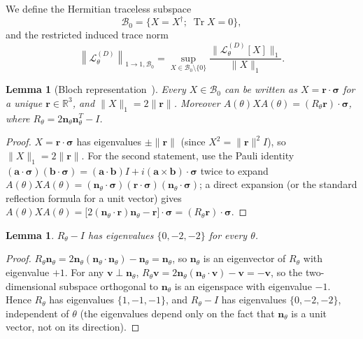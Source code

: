 \documentclass[aps,pra,reprint,superscriptaddress,nofootinbib,longbibliography]{revtex4-2}
\newtheorem{lemma}[theorem]{Lemma}
\newcommand{\Bzero}{\mathcal{B}_0}
\newcommand{\supnorm}[1]{\left\|#1\right\|_{1\rightarrow1,\Bzero}}
\begin{document}
We define the Hermitian traceless subspace
\begin{equation}
\mathcal{B}_0 = \{X=X^\dagger;\; \operatorname{Tr}X=0\},
\label{eq:B0}
\end{equation}
and the restricted induced trace norm
\begin{equation}
\supnorm{\mathcal{L}^{(D)}_\theta}
= \sup_{X\in\mathcal{B}_0\setminus\{0\}}
\frac{\|\mathcal{L}^{(D)}_\theta[X]\|_1}{\|X\|_1}.
\label{eq:norm}
\end{equation}

\begin{lemma}[Bloch representation~\cite{nielsen2010quantum}]
\label{lem:isometry}
Every $X\in\mathcal{B}_0$ can be written as $X=\mathbf{r}\cdot\boldsymbol{\sigma}$
for a unique $\mathbf{r}\in\mathbb R^3$, and $\|X\|_1=2\|\mathbf{r}\|$.
Moreover $A(\theta)XA(\theta) = (R_\theta\mathbf r)\cdot\boldsymbol\sigma$,
where $R_\theta = 2\mathbf n_\theta\mathbf n_\theta^{T}-I$.
\end{lemma}
\begin{proof}
$X=\mathbf r\cdot\boldsymbol\sigma$ has eigenvalues $\pm\|\mathbf r\|$
(since $X^2=\|\mathbf r\|^2I$), so $\|X\|_1=2\|\mathbf r\|$. For the
second statement, use the Pauli identity
$(\mathbf a\cdot\boldsymbol\sigma)(\mathbf b\cdot\boldsymbol\sigma)
=(\mathbf a\cdot\mathbf b)I+i(\mathbf a\times\mathbf b)\cdot\boldsymbol\sigma$
twice to expand $A(\theta)XA(\theta)=(\mathbf n_\theta\cdot\boldsymbol\sigma)
(\mathbf r\cdot\boldsymbol\sigma)(\mathbf n_\theta\cdot\boldsymbol\sigma)$; a
direct expansion (or the standard reflection formula for a unit
vector) gives
$A(\theta)XA(\theta) = \bigl[2(\mathbf n_\theta\cdot\mathbf r)\mathbf n_\theta-\mathbf r\bigr]\cdot\boldsymbol\sigma
= (R_\theta\mathbf r)\cdot\boldsymbol\sigma$.
\end{proof}

\begin{lemma}
\label{lem:eigenvalues}
$R_\theta-I$ has eigenvalues $\{0,-2,-2\}$ for every $\theta$.
\end{lemma}
\begin{proof}
$R_\theta\mathbf n_\theta = 2\mathbf n_\theta(\mathbf n_\theta\cdot\mathbf n_\theta)-\mathbf n_\theta
=\mathbf n_\theta$, so $\mathbf n_\theta$ is an eigenvector of $R_\theta$
with eigenvalue $+1$. For any $\mathbf v\perp\mathbf n_\theta$,
$R_\theta\mathbf v=2\mathbf n_\theta(\mathbf n_\theta\cdot\mathbf v)-\mathbf v=-\mathbf v$,
so the two-dimensional subspace orthogonal to $\mathbf n_\theta$ is an
eigenspace with eigenvalue $-1$. Hence $R_\theta$ has eigenvalues
$\{1,-1,-1\}$, and $R_\theta-I$ has eigenvalues $\{0,-2,-2\}$,
independent of $\theta$ (the eigenvalues depend only on the fact that
$\mathbf n_\theta$ is a unit vector, not on its direction).
\end{proof}
\end{document}
